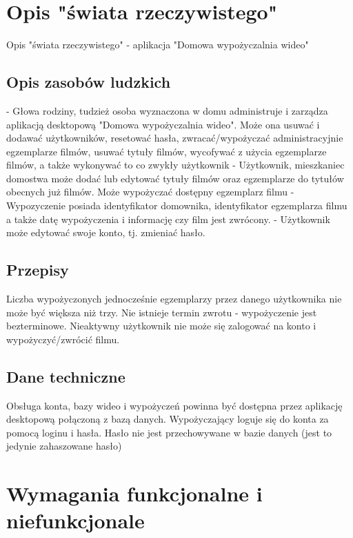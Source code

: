 \documentclass{article}
\begin{document}
	\section{Opis "świata rzeczywistego"}
	Opis "świata rzeczywistego" - aplikacja "Domowa wypożyczalnia wideo"
	\subsection{Opis zasobów ludzkich}
		- Głowa rodziny, tudzież osoba wyznaczona w domu administruje i zarządza aplikacją desktopową "Domowa wypożyczalnia wideo". Może ona usuwać i dodawać użytkowników, resetować hasła, zwracać/wypożyczać administracyjnie egzemplarze filmów, usuwać tytuły filmów, wycofywać z użycia egzemplarze filmów, a także wykonywać to co zwykły użytkownik
		- Użytkownik, mieszkaniec domostwa może dodać lub edytować tytuły filmów oraz egzemplarze do tytułów obecnych już filmów. Może wypożyczać dostępny egzemplarz filmu
		- Wypozyczenie posiada identyfikator domownika, identyfikator egzemplarza filmu a także datę wypożyczenia i informację czy film jest zwrócony.
		- Użytkownik może edytować swoje konto, tj. zmieniać hasło.
	\subsection{Przepisy}
		Liczba wypożyczonych jednocześnie egzemplarzy przez danego użytkownika nie może być większa niż trzy. Nie istnieje termin zwrotu - wypożyczenie jest bezterminowe. Nieaktywny użytkownik nie może się zalogować na konto i wypożyczyć/zwrócić filmu.
	\subsection{Dane techniczne}
		 Obsługa konta, bazy wideo i wypożyczeń powinna być dostępna przez aplikację desktopową połączoną z bazą danych.
		Wypożyczający loguje się do konta za pomocą loginu i hasła. Hasło nie jest przechowywane w bazie danych (jest to jedynie zahaszowane hasło)
	
	\section{Wymagania funkcjonalne i niefunkcjonale}
\end{document}
